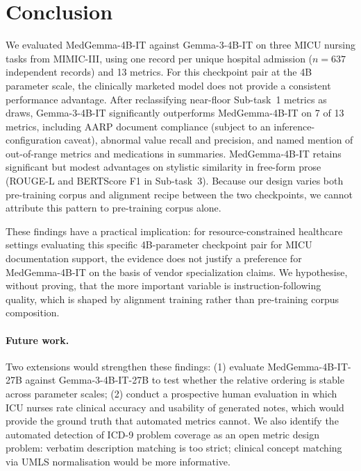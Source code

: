 \documentclass[sigconf,anonymous=false,review=false]{acmart}
\newcommand{\medgemma}{MedGemma-4B-IT\xspace}
\newcommand{\gemma}{Gemma-3-4B-IT\xspace}
\begin{document}
\section{Conclusion}
\label{sec:conclusion}

We evaluated \medgemma against \gemma on three MICU nursing tasks from
MIMIC-III, using one record per unique hospital admission ($n = 637$
independent records) and 13 metrics. For this checkpoint pair at the 4B
parameter scale, the clinically marketed model does not provide a consistent
performance advantage. After reclassifying near-floor Sub-task~1 metrics as
draws, \gemma significantly outperforms \medgemma on 7 of 13 metrics,
including AARP document compliance (subject to an inference-configuration
caveat), abnormal value recall and precision, and named mention of
out-of-range metrics and medications in summaries. \medgemma retains
significant but modest advantages on stylistic similarity in free-form prose
(ROUGE-L and BERTScore F1 in Sub-task~3). Because our design varies both
pre-training corpus and alignment recipe between the two checkpoints, we
cannot attribute this pattern to pre-training corpus alone.

These findings have a practical implication: for resource-constrained
healthcare settings evaluating this specific 4B-parameter checkpoint pair
for MICU documentation support, the evidence does not justify a preference
for \medgemma on the basis of vendor specialization claims.
We hypothesise, without proving, that the more important variable is
instruction-following quality, which is shaped by alignment training rather
than pre-training corpus composition.

\paragraph{Future work.}
Two extensions would strengthen these findings: (1) evaluate
\medgemma-27B against \gemma-27B to test whether the relative ordering is
stable across parameter scales;
(2) conduct a prospective human evaluation in which ICU nurses rate clinical
accuracy and usability of generated notes, which would provide the ground
truth that automated metrics cannot. We also identify the automated detection
of ICD-9 problem coverage as an open metric design problem: verbatim
description matching is too strict; clinical concept matching via UMLS
normalisation would be more informative.

\end{document}

